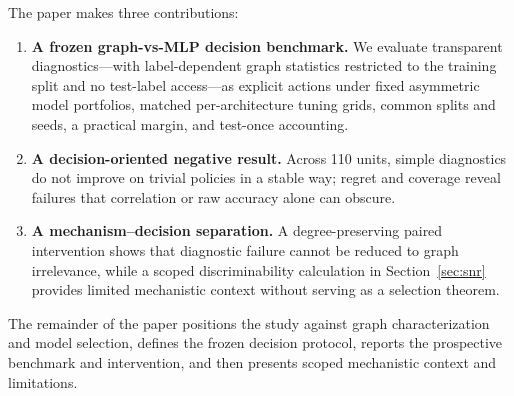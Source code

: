 The paper makes three contributions:
\begin{enumerate}
    \item \textbf{A frozen graph-vs-MLP decision benchmark.} We evaluate transparent diagnostics---with label-dependent graph statistics restricted to the training split and no test-label access---as explicit actions under fixed asymmetric model portfolios, matched per-architecture tuning grids, common splits and seeds, a practical margin, and test-once accounting.
    \item \textbf{A decision-oriented negative result.} Across 110 units, simple diagnostics do not improve on trivial policies in a stable way; regret and coverage reveal failures that correlation or raw accuracy alone can obscure.
    \item \textbf{A mechanism--decision separation.} A degree-preserving paired intervention shows that diagnostic failure cannot be reduced to graph irrelevance, while a scoped discriminability calculation in Section~\ref{sec:snr} provides limited mechanistic context without serving as a selection theorem.
\end{enumerate}

The remainder of the paper positions the study against graph characterization and model selection, defines the frozen decision protocol, reports the prospective benchmark and intervention, and then presents scoped mechanistic context and limitations.
